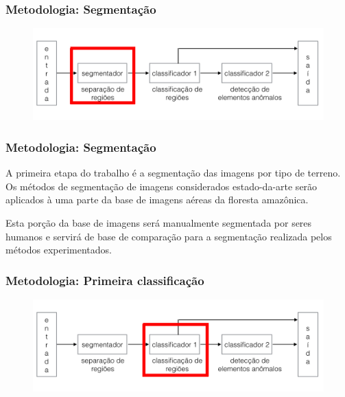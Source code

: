 \documentclass[t]{beamer}
\begin{document}
\begin{frame}[c]
	\frametitle{Metodologia: Segmentação}
	\begin{figure}[h]
    	\includegraphics[width=\textwidth]{imgs/arquitetura_1}
	\end{figure}
\end{frame}

\begin{frame}
	\frametitle{Metodologia: Segmentação}

	A primeira etapa do trabalho é a segmentação das imagens por tipo de terreno. Os métodos de segmentação de imagens considerados estado-da-arte serão aplicados à uma parte da base de imagens aéreas da floresta amazônica. 
	
	\vspace{0.5cm}
	
	Esta porção da base de imagens será manualmente segmentada por seres humanos e servirá de base de comparação para a segmentação realizada pelos métodos experimentados.

\end{frame}

\begin{frame}[c]
	\frametitle{Metodologia: Primeira classificação}
	\begin{figure}[h]
    	\includegraphics[width=\textwidth]{imgs/arquitetura_2}
	\end{figure}
\end{frame}
\end{document}
